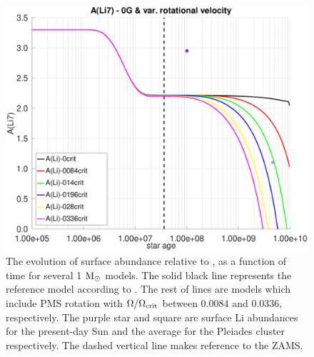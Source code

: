 \documentclass[fleqn,usenatbib]{mnras}
\begin{document}
\begin{figure}
	\includegraphics[trim = 25mm 10mm 15mm 10mm, clip, width=\columnwidth]{figures/paper1/li_var_vel_0_0g.eps}
    \caption{The evolution of surface  abundance relative to , as a function of time for several 1 $\mathrm{M}_\odot$ models. The solid black line represents the reference model according to \citet{Choi2016}. The rest of lines are models which include PMS rotation with $\Omega / \Omega_{\mathrm{crit}}$ between 0.0084 and 0.0336, respectively. The purple star and square are surface Li abundances for the present-day Sun \citep{Asplund2009} and the average for the Pleiades cluster \citep{Sestito2005} respectively. The dashed vertical line makes reference to the ZAMS.}
    \label{fig:li_var_vel_0g}
\end{figure}
\end{document}
